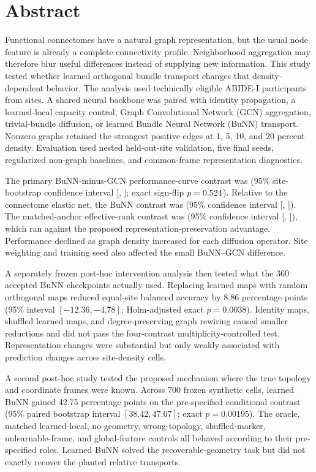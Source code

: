 \documentclass[11pt,a4paper]{article}
\begin{document}
\section*{Abstract}

Functional connectomes have a natural graph representation, but the usual
node feature is already a complete connectivity profile. Neighborhood
aggregation may therefore blur useful differences instead of supplying new
information. This study tested whether learned orthogonal bundle transport
changes that density-dependent behavior. The analysis used
\StudyParticipants{} technically eligible ABIDE-I participants from
\StudySites{} sites. A shared neural backbone was paired with identity
propagation, a learned-local capacity control, Graph Convolutional Network
(GCN) aggregation, trivial-bundle diffusion, or learned Bundle Neural Network
(BuNN) transport. Nonzero graphs retained the strongest positive edges at 1,
5, 10, and 20 percent density. Evaluation used nested held-out-site validation,
five final seeds, regularized non-graph baselines, and common-frame
representation diagnostics.

The primary BuNN-minus-GCN performance-curve contrast was
\BunnGcnEstimate{} (95\% site-bootstrap confidence interval
[\BunnGcnCILow{}, \BunnGcnCIHigh{}]; exact sign-flip
$p=0.524$). Relative to the connectome elastic net, the BuNN contrast was
\BunnElasticEstimate{} (95\% confidence interval
[\BunnElasticCILow{}, \BunnElasticCIHigh{}]). The matched-anchor
effective-rank contrast was \RankEstimate{} (95\% confidence interval
[\RankCILow{}, \RankCIHigh{}]), which ran against the proposed
representation-preservation advantage. Performance declined as graph density
increased for each diffusion operator. Site weighting and training seed also
affected the small BuNN--GCN difference.

A separately frozen post-hoc intervention analysis then tested what the 360
accepted BuNN checkpoints actually used. Replacing learned maps with random
orthogonal maps reduced equal-site balanced accuracy by 8.86 percentage
points (95\% interval $[-12.36,-4.78]$; Holm-adjusted exact
$p=0.0038$). Identity maps, shuffled learned maps, and degree-preserving graph
rewiring caused smaller reductions and did not pass the four-contrast
multiplicity-controlled test. Representation changes were substantial but
only weakly associated with prediction changes across site-density cells.

A second post-hoc study tested the proposed mechanism where the true topology
and coordinate frames were known. Across 700 frozen synthetic cells, learned
BuNN gained 42.75 percentage points on the pre-specified conditional contrast
(95\% paired bootstrap interval $[38.42,47.67]$; exact $p=0.00195$). The
oracle, matched learned-local, no-geometry, wrong-topology, shuffled-marker,
unlearnable-frame, and global-feature controls all behaved according to their
pre-specified roles. Learned BuNN solved the recoverable-geometry task but did
not exactly recover the planted relative transports.
\end{document}
